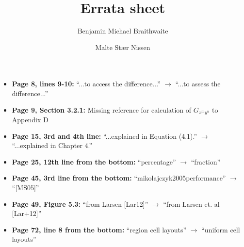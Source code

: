 \documentclass[a4paper,11pt]{article}
\title{\textbf{Errata sheet}}
\author{Benjamin Michael Braithwaite \\ \and Malte Stær Nissen}
\begin{document}
\maketitle

\begin{itemize}
\item{\textbf{Page 8, lines 9-10:} ``...to access the difference...'' $\rightarrow$ ``...to assess the difference...''}
\item{\textbf{Page 9, Section 3.2.1:} Missing reference for calculation of $G_{x^m y^n}$ to Appendix D}
\item{\textbf{Page 15, 3rd and 4th line:} ``...explained in Equation (4.1).'' $\rightarrow$ ``...explained in Chapter 4.''}
\item{\textbf{Page 25, 12th line from the bottom:} ``percentage'' $\rightarrow$ ``fraction''}
\item{\textbf{Page 45, 3rd line from the bottom:} ``mikolajczyk2005performance'' $\rightarrow$ ``[MS05]''}
\item{\textbf{Page 49, Figure 5.3:} ``from Larsen [Lar12]'' $\rightarrow$ ``from Larsen et. al [Lar+12]''}
\item{\textbf{Page 72, line 8 from the bottom:} ``region cell layouts'' $\rightarrow$ ``uniform cell layouts''}
\end{itemize}
\end{document}

